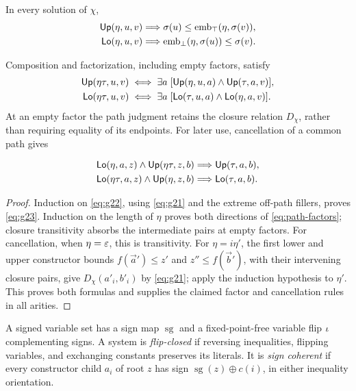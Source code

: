 \begin{lemma}\label{lem:path-rules}
In every solution of $\chi$,
\begin{equation}\label{eq:g23}
\begin{aligned}
 \mathsf{Up}(\eta,u,v)&\Longrightarrow
 \sigma(u)\le\operatorname{emb}_{\top}(\eta,\sigma(v)),\\
 \mathsf{Lo}(\eta,u,v)&\Longrightarrow
 \operatorname{emb}_{\bot}(\eta,\sigma(u))\le \sigma(v).
 \end{aligned}
\end{equation}

Composition and factorization, including empty factors, satisfy
\begin{equation}\label{eq:path-factors}
\begin{aligned}
\mathsf{Up}(\eta\tau,u,v)&\iff\exists a\;[\mathsf{Up}(\eta,u,a)\land\mathsf{Up}(\tau,a,v)],\\
\mathsf{Lo}(\eta\tau,u,v)&\iff\exists a\;[\mathsf{Lo}(\tau,u,a)\land\mathsf{Lo}(\eta,a,v)].
\end{aligned}
\end{equation}
At an empty factor the path judgment retains the closure relation
$D_\chi$, rather than requiring equality of its endpoints.
For later use, cancellation of a common path gives

\begin{equation}\label{eq:g24}
\begin{aligned}
 \mathsf{Lo}(\eta,a,z)\land
 \mathsf{Up}(\eta\tau,z,b)
 &\Longrightarrow\mathsf{Up}(\tau,a,b),\\
 \mathsf{Lo}(\eta\tau,a,z)\land
 \mathsf{Up}(\eta,z,b)
 &\Longrightarrow\mathsf{Lo}(\tau,a,b).
 \end{aligned}
\end{equation}

\end{lemma}
\begin{proof}
Induction on \eqref{eq:g22}, using \eqref{eq:g21} and the extreme
off-path fillers, proves \eqref{eq:g23}. Induction on the length of
$\eta$ proves both directions of \eqref{eq:path-factors}; closure
transitivity absorbs the intermediate pairs at empty factors.
For cancellation, when $\eta=\varepsilon$, this is transitivity. For $\eta=i\eta'$, the first
lower and upper constructor bounds $f(\vec a')\le z'$ and
$z''\le f(\vec b')$, with their intervening closure pairs,
give $D_\chi(a'_i,b'_i)$ by \eqref{eq:g21}; apply the induction hypothesis to $\eta'$.
This proves both formulas and supplies the claimed factor and cancellation
rules in all arities. \end{proof}

A signed variable set has a sign map $\operatorname{sg}$ and a
fixed-point-free variable flip $\iota$ complementing signs. A system is
\emph{flip-closed} if reversing inequalities, flipping variables, and
exchanging constants preserves its literals. It is \emph{sign coherent}
if every constructor child $a_i$ of root $z$ has sign
$\operatorname{sg}(z)\oplus c(i)$, in either inequality orientation.

